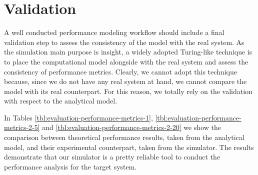 \section{Validation}
\label{sec:performance-modeling-validation}
A well conducted performance modeling workflow should include a final validation step to assess the consistency of the model with the real system. 
%
As the simulation main purpose is insight, a widely adopted Turing-like technique is to place the computational model alongside with the real system and assess the consistency of performance metrics.
%
Clearly, we cannot adopt this technique because, since we do not have any real system at hand, we cannot compare the model with its real counterpart.
%
For this reason, we totally rely on the validation with respect to the analytical model.

In Tables \ref{tbl:evaluation-performance-metrics-1}, \ref{tbl:evaluation-performance-metrics-2-5} and \ref{tbl:evaluation-performance-metrics-2-20} we show the comparison between theoretical performance results, taken from the analytical model, and their experimental counterpart, taken from the simulator.
%
The results demonstrate that our simulator is a pretty reliable tool to conduct the performance analysis for the target system. 